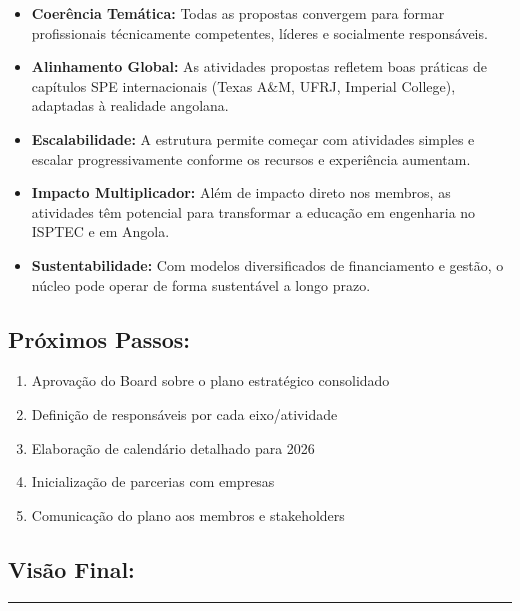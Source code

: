 \documentclass[12pt,a4paper]{article}
\begin{document}
\begin{itemize}[itemsep=0.3cm]
    \item \textbf{Coerência Temática:} Todas as propostas convergem para formar profissionais técnicamente competentes, líderes e socialmente responsáveis.
    
    \item \textbf{Alinhamento Global:} As atividades propostas refletem boas práticas de capítulos SPE internacionais (Texas A\&M, UFRJ, Imperial College), adaptadas à realidade angolana.
    
    \item \textbf{Escalabilidade:} A estrutura permite começar com atividades simples e escalar progressivamente conforme os recursos e experiência aumentam.
    
    \item \textbf{Impacto Multiplicador:} Além de impacto direto nos membros, as atividades têm potencial para transformar a educação em engenharia no ISPTEC e em Angola.
    
    \item \textbf{Sustentabilidade:} Com modelos diversificados de financiamento e gestão, o núcleo pode operar de forma sustentável a longo prazo.
\end{itemize}

\subsection*{Próximos Passos:}

\begin{enumerate}[itemsep=0.25cm]
    \item[\checkmark] Aprovação do Board sobre o plano estratégico consolidado
    \item[\checkmark] Definição de responsáveis por cada eixo/atividade
    \item[\checkmark] Elaboração de calendário detalhado para 2026
    \item[\checkmark] Inicialização de parcerias com empresas
    \item[\checkmark] Comunicação do plano aos membros e stakeholders
\end{enumerate}

\subsection*{Visão Final:}

\textcolor{spe-secondary}{\rule{\linewidth}{0.5pt}}
\end{document}
